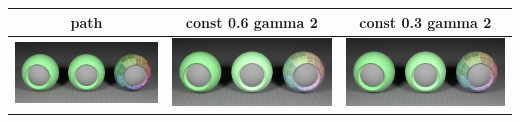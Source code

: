 \documentclass[11pt]{article}
\begin{document}
\begin{table}[ht]
  \centering
  \begin{tabular}{ | c | c | c |}
    \hline
    path & const 0.6 gamma 2 & const 0.3 gamma 2 \\ \hline
    \begin{minipage}{.3\textwidth}
      \includegraphics[scale=0.1]{img/obj/plastics_al/plastics_al.jpg}
    \end{minipage}
    &
    \begin{minipage}{.3\textwidth}
      \includegraphics[scale=0.1]{img/obj/plastics_al/plastics_al_disney.jpg}
    \end{minipage}
    & 
    \begin{minipage}{.3\textwidth}
      \includegraphics[scale=0.1]{img/obj/plastics_al/plastics_al_disney_dc03.jpg}
    \end{minipage}
    \\ \hline
  \end{tabular}
\end{table}
\end{document}
